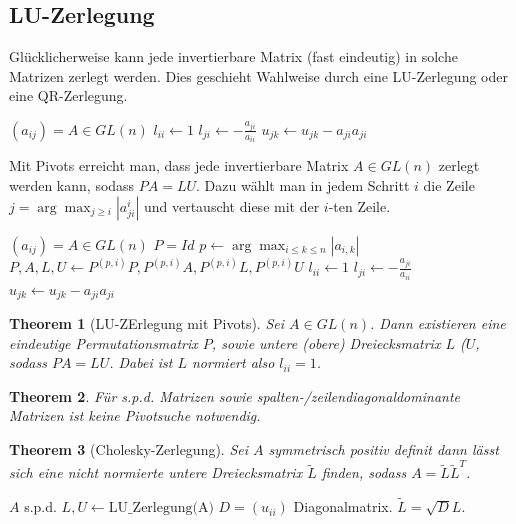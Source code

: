 \documentclass[10pt,a4paper]{article}
\newtheorem{theorem}{Theorem}
\begin{document}
	\subsection{LU-Zerlegung}
	Glücklicherweise kann jede invertierbare Matrix (fast eindeutig) in solche Matrizen zerlegt werden. Dies geschieht Wahlweise durch eine LU-Zerlegung oder eine QR-Zerlegung.
	\begin{algorithm}
		\caption{LU-Zerlegung ohne Pivots}
		\begin{algorithmic}
			\Require $(a_{ij}) = A \in GL(n)$
				\State $l_{ii} \leftarrow 1$
					\State $l_{ji} \leftarrow -\frac{a_{ji}}{a_{ii}}$
						\State $u_{jk} \leftarrow u_{jk} - a_{ji}a_{ji}$
					\EndFor
				\EndFor
			\EndFor
		\end{algorithmic}
	\end{algorithm}
	Mit Pivots erreicht man, dass jede invertierbare Matrix $A \in GL(n)$ zerlegt werden kann, sodass $PA = LU$. Dazu wählt man in jedem Schritt $i$ die Zeile $j = \arg \max_{j\geq i} |a^i_{ji}|$ und vertauscht diese mit der $i$-ten Zeile. 
	\begin{algorithm}[H]
		\caption{LU-Zerlegung mit Pivots}
		\begin{algorithmic}
			\Require $(a_{ij}) = A \in GL(n)$ 
			\State $P = Id$
			\For{$i\in 1:n$}
				\State $p \leftarrow\arg\max_{i\leq k\leq n} |a_{i,k}|$
				\State $P, A, L, U \leftarrow P^{(p, i)} P, P^{(p, i)}A, P^{(p, i)}L, P^{(p, i)}U $
				\State $l_{ii} \leftarrow 1$
				\For{$j \in i+1:n$}
					\State $l_{ji} \leftarrow -\frac{a_{ji}}{a_{ii}}$
					\For{$k\in i:n$}
						\State $u_{jk} \leftarrow u_{jk} - a_{ji}a_{ji}$
					\EndFor
				\EndFor
			\EndFor
		\end{algorithmic}
	\end{algorithm}
	\begin{theorem}[LU-ZErlegung mit Pivots]
		Sei $A \in GL(n)$. Dann existieren eine eindeutige Permutationsmatrix $P$, sowie untere (obere) Dreiecksmatrix $L$ ($U$, sodass $PA =LU$. Dabei ist $L$ normiert also $l_{ii}= 1$.
	\end{theorem}
	\begin{theorem}
		Für s.p.d. Matrizen sowie spalten-/zeilendiagonaldominante Matrizen ist keine Pivotsuche notwendig.
	\end{theorem}
	\begin{theorem}[Cholesky-Zerlegung]
		Sei $A$ symmetrisch positiv definit dann lässt sich eine nicht normierte untere Dreiecksmatrix $\tilde{L}$ finden, sodass $A = \tilde{L}\tilde{L}^T$.
	\end{theorem}
	\begin{algorithm}
		\caption{Berechnung der Cholesky Zerlegung}
		\begin{algorithmic}
			\Require $A$ s.p.d.
			\State $L, U \leftarrow \text{LU\_Zerlegung(A)}$
			\State $D = (u_{ii})$ Diagonalmatrix.
			\State $\tilde{L} = \sqrt{D}L$.
		\end{algorithmic}
	\end{algorithm}
\end{document}
